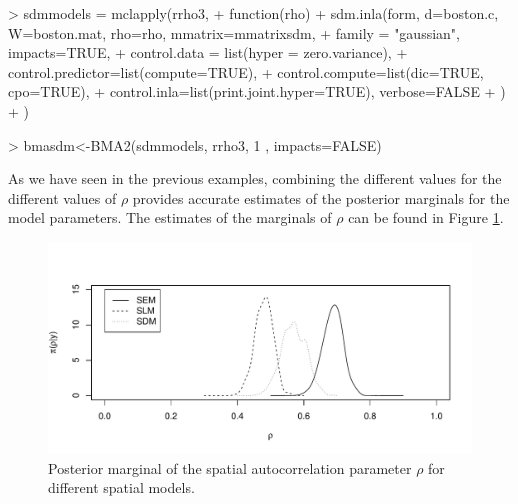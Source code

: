 \documentclass[article]{jss}
\begin{document}
\begin{Schunk}
\begin{Sinput}
> sdmmodels = mclapply(rrho3,
+         function(rho) {
+                 sdm.inla(form, d=boston.c, W=boston.mat, rho=rho, mmatrix=mmatrixsdm,
+                         family = "gaussian", impacts=TRUE,
+                         control.data = list(hyper = zero.variance),
+                         control.predictor=list(compute=TRUE),
+                         control.compute=list(dic=TRUE, cpo=TRUE),
+                         control.inla=list(print.joint.hyper=TRUE), verbose=FALSE
+                 )
+         })
\end{Sinput}
\end{Schunk}

\begin{Schunk}
\begin{Sinput}
> bmasdm<-BMA2(sdmmodels, rrho3, 1 , impacts=FALSE)
\end{Sinput}
\end{Schunk}

As we have seen in the previous examples, combining the different values 
for the different values of $\rho$ provides accurate estimates of the posterior
marginals for the model parameters. The estimates of the marginals of
$\rho$ can be found in Figure \ref{fig:pmargrho}.

\begin{figure}[h]
\begin{center}
\includegraphics{spatial_inla-044}
\end{center}
\caption{Posterior marginal of the spatial autocorrelation parameter $\rho$
for different spatial models.}
\label{fig:pmargrho}
\end{figure} 



\end{document}
